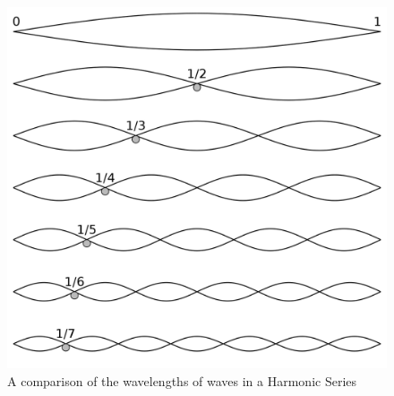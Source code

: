 \begin{figure}[h!]
  \centering
  \includegraphics[width=0.5\linewidth]{image/Harmonics.png}
  \caption{A comparison of the wavelengths of waves in a Harmonic Series \autocite{harmonicSeries}}
\end{figure}


